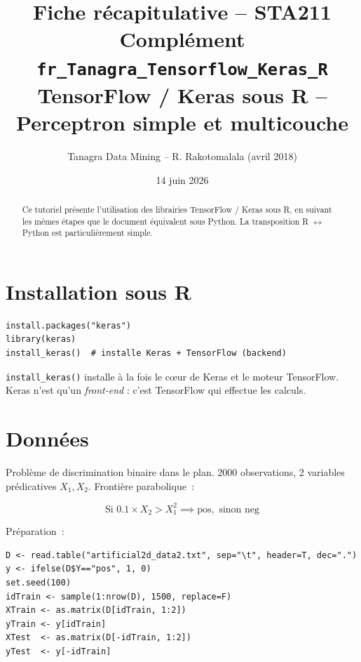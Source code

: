 \documentclass[a4paper,11pt]{article}
\title{\textbf{Fiche r\'ecapitulative -- STA211}\\[4pt]
\large Compl\'ement \texttt{fr\_Tanagra\_Tensorflow\_Keras\_R} \\[2pt]
\small TensorFlow / Keras sous R -- Perceptron simple et multicouche}
\author{Tanagra Data Mining -- R. Rakotomalala (avril 2018)}
\date{14 juin 2026}
\begin{document}
\maketitle
\thispagestyle{empty}

\begin{abstract}
Ce tutoriel pr\'esente l'utilisation des librairies TensorFlow / Keras sous R,
en suivant les m\^emes \'etapes que le document \'equivalent sous Python.
La transposition R $\leftrightarrow$ Python est particuli\`erement simple.
\end{abstract}

\vfill
\tableofcontents
\newpage

\section{Installation sous R}

\begin{lstlisting}
install.packages("keras")
library(keras)
install_keras()  # installe Keras + TensorFlow (backend)
\end{lstlisting}

\noindent\texttt{install\_keras()} installe \`a la fois le c\oe ur de Keras et le moteur
TensorFlow. Keras n'est qu'un \emph{front-end} : c'est TensorFlow qui effectue
les calculs.

\section{Donn\'ees}

Probl\`eme de discrimination binaire dans le plan. 2000 observations,
2 variables pr\'edicatives $X_1, X_2$. Fronti\`ere parabolique~:

\[
\text{Si } 0.1 \times X_2 > X_1^2 \implies \text{pos}, \text{ sinon neg}
\]

Pr\'eparation~:
\begin{lstlisting}
D <- read.table("artificial2d_data2.txt", sep="\t", header=T, dec=".")
y <- ifelse(D$Y=="pos", 1, 0)
set.seed(100)
idTrain <- sample(1:nrow(D), 1500, replace=F)
XTrain <- as.matrix(D[idTrain, 1:2])
yTrain <- y[idTrain]
XTest  <- as.matrix(D[-idTrain, 1:2])
yTest  <- y[-idTrain]
\end{lstlisting}
\end{document}
